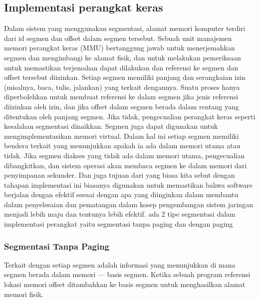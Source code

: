 \subsection{Implementasi perangkat keras}
Dalam sistem yang menggunakan segmentasi, alamat memori komputer terdiri dari id segmen dan offset dalam segmen tersebut. Sebuah unit manajemen memori perangkat keras (MMU) bertanggung jawab untuk menerjemahkan segmen dan mengimbangi ke alamat fisik, dan untuk melakukan pemeriksaan untuk memastikan terjemahan dapat dilakukan dan referensi ke segmen dan offset tersebut diizinkan.
Setiap segmen memiliki panjang dan serangkaian izin (misalnya, baca, tulis, jalankan) yang terkait dengannya. Suatu proses hanya diperbolehkan untuk membuat referensi ke dalam segmen jika jenis referensi diizinkan oleh izin, dan jika offset dalam segmen berada dalam rentang yang ditentukan oleh panjang segmen. Jika tidak, pengecualian perangkat keras seperti kesalahan segmentasi dinaikkan.
Segmen juga dapat digunakan untuk mengimplementasikan memori virtual. Dalam hal ini setiap segmen memiliki bendera terkait yang menunjukkan apakah ia ada dalam memori utama atau tidak. Jika segmen diakses yang tidak ada dalam memori utama, pengecualian dibangkitkan, dan sistem operasi akan membaca segmen ke dalam memori dari penyimpanan sekunder.
Dan juga tujuan dari yang biasa kita sebut dengan tahapan implementasi ini biasanya digunakan untuk memastikan bahwa software berjalan dengan efektif sesuai dengan apa yang diinginkan dalam membantu dalam penyelesaian dan pematangan dalam kosep pengembangan sistem jaringan menjadi lebih maju dan tentunya lebih efektif. ada 2 tipe segmentasi dalam implementasi perangkat yaitu segmentasi tanpa paging dan dengan paging
\subsubsection {Segmentasi Tanpa Paging}
Terkait dengan setiap segmen adalah informasi yang menunjukkan di mana segmen berada dalam memori — basis segmen. Ketika sebuah program referensi lokasi memori offset ditambahkan ke basis segmen untuk menghasilkan alamat memori fisik.